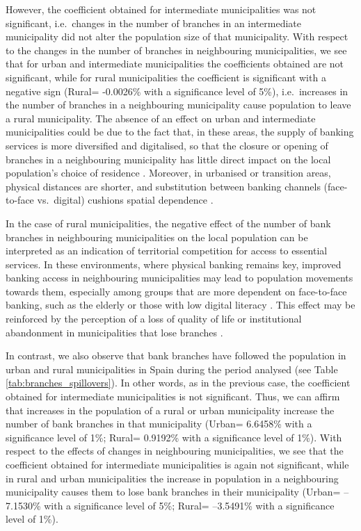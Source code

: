 \documentclass[a4paper,11pt,oneside]{article}
\begin{document}
However, the coefficient obtained for intermediate municipalities was not significant, i.e.\ changes in the number of branches in an intermediate municipality did not alter the population size of that municipality. With respect to the changes in the number of branches in neighbouring municipalities, we see that for urban and intermediate municipalities the coefficients obtained are not significant, while for rural municipalities the coefficient is significant with a negative sign (Rural= -0.0026\% with a significance level of 5\%), i.e.\ increases in the number of branches in a neighbouring municipality cause population to leave a rural municipality. The absence of an effect on urban and intermediate municipalities could be due to the fact that, in these areas, the supply of banking services is more diversified and digitalised, so that the closure or opening of branches in a neighbouring municipality has little direct impact on the local population's choice of residence \citep{narayanan2025decline}. Moreover, in urbanised or transition areas, physical distances are shorter, and substitution between banking channels (face-to-face vs.\ digital) cushions spatial dependence \citep{de2025banking}.



In the case of rural municipalities, the negative effect of the number of bank branches in neighbouring municipalities on the local population can be interpreted as an indication of territorial competition for access to essential services. In these environments, where physical banking remains key, improved banking access in neighbouring municipalities may lead to population movements towards them, especially among groups that are more dependent on face-to-face banking, such as the elderly or those with low digital literacy \citep{dumont2019perspectives}. This effect may be reinforced by the perception of a loss of quality of life or institutional abandonment in municipalities that lose branches \citep{higgs2022investigating}.





In contrast, we also observe that bank branches have followed the population in urban and rural municipalities in Spain during the period analysed (see Table \ref{tab:branches_spillovers}). In other words, as in the previous case, the coefficient obtained for intermediate municipalities is not significant. Thus, we can affirm that increases in the population of a rural or urban municipality increase the number of bank branches in that municipality (Urban= 6.6458\% with a significance level of 1\%; Rural= 0.9192\% with a significance level of 1\%). With respect to the effects of changes in neighbouring municipalities, we see that the coefficient obtained for intermediate municipalities is again not significant, while in rural and urban municipalities the increase in population in a neighbouring municipality causes them to lose bank branches in their municipality (Urban= --7.1530\% with a significance level of 5\%; Rural= --3.5491\% with a significance level of 1\%).
\end{document}
